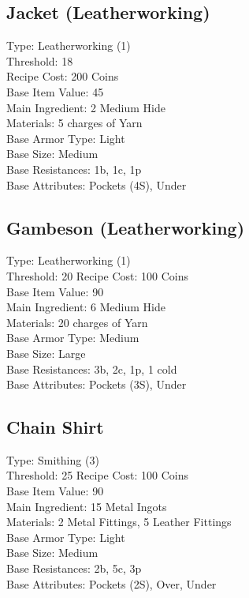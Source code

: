 \subsection{Jacket (Leatherworking)}\label{recipe:jacketLeather}
Type: Leatherworking (1)\\
Threshold: 18\\
Recipe Cost: 200 Coins\\
Base Item Value: 45\\
Main Ingredient: 2 Medium Hide\\
Materials: 5 charges of Yarn\\
Base Armor Type: Light\\
Base Size: Medium\\
Base Resistances: 1b, 1c, 1p\\
Base Attributes: Pockets (4S), Under\\

\subsection{Gambeson (Leatherworking)}\label{recipe:gambesonLeather}
Type: Leatherworking (1)\\
Threshold: 20
Recipe Cost: 100 Coins\\
Base Item Value: 90\\
Main Ingredient: 6 Medium Hide\\
Materials: 20 charges of Yarn\\
Base Armor Type: Medium\\
Base Size: Large \\
Base Resistances: 3b, 2c, 1p, 1 cold\\
Base Attributes: Pockets (3S), Under\\

\subsection{Chain Shirt}\label{recipe:chainShirt}
Type: Smithing (3)\\
Threshold: 25
Recipe Cost: 100 Coins\\
Base Item Value: 90\\
Main Ingredient: 15 Metal Ingots\\
Materials: 2 Metal Fittings, 5 Leather Fittings\\
Base Armor Type: Light\\
Base Size: Medium \\
Base Resistances: 2b, 5c, 3p\\
Base Attributes: Pockets (2S), Over, Under\\

